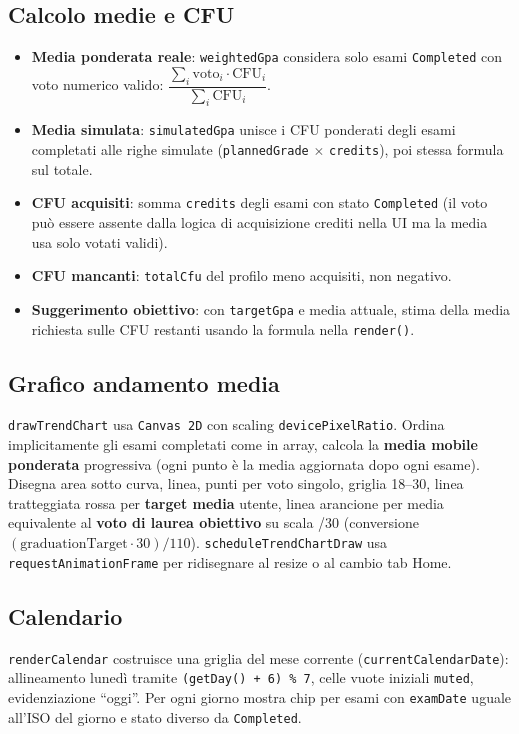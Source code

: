 \documentclass[11pt,a4paper]{article}
\begin{document}
\subsection{Calcolo medie e CFU}
\begin{itemize}[leftmargin=*]
  \item \textbf{Media ponderata reale}: \texttt{weightedGpa} considera solo esami \texttt{Completed} con voto numerico valido:
  $\dfrac{\sum_i \mathrm{voto}_i \cdot \mathrm{CFU}_i}{\sum_i \mathrm{CFU}_i}$.
  \item \textbf{Media simulata}: \texttt{simulatedGpa} unisce i CFU ponderati degli esami completati alle righe simulate (\texttt{plannedGrade} $\times$ \texttt{credits}), poi stessa formula sul totale.
  \item \textbf{CFU acquisiti}: somma \texttt{credits} degli esami con stato \texttt{Completed} (il voto può essere assente dalla logica di acquisizione crediti nella UI ma la media usa solo votati validi).
  \item \textbf{CFU mancanti}: \texttt{totalCfu} del profilo meno acquisiti, non negativo.
  \item \textbf{Suggerimento obiettivo}: con \texttt{targetGpa} e media attuale, stima della media richiesta sulle CFU restanti usando la formula nella \texttt{render()}.
\end{itemize}

\subsection{Grafico andamento media}
\texttt{drawTrendChart} usa \texttt{Canvas 2D} con scaling \texttt{devicePixelRatio}. Ordina implicitamente gli esami completati come in array, calcola la \textbf{media mobile ponderata} progressiva (ogni punto è la media aggiornata dopo ogni esame). Disegna area sotto curva, linea, punti per voto singolo, griglia 18--30, linea tratteggiata rossa per \textbf{target media} utente, linea arancione per media equivalente al \textbf{voto di laurea obiettivo} su scala /30 (conversione $(\mathrm{graduationTarget} \cdot 30) / 110$). \texttt{scheduleTrendChartDraw} usa \texttt{requestAnimationFrame} per ridisegnare al resize o al cambio tab Home.

\subsection{Calendario}
\texttt{renderCalendar} costruisce una griglia del mese corrente (\texttt{currentCalendarDate}): allineamento lunedì tramite \texttt{(getDay() + 6) \% 7}, celle vuote iniziali \texttt{muted}, evidenziazione ``oggi''. Per ogni giorno mostra chip per esami con \texttt{examDate} uguale all'ISO del giorno e stato diverso da \texttt{Completed}.
\end{document}
